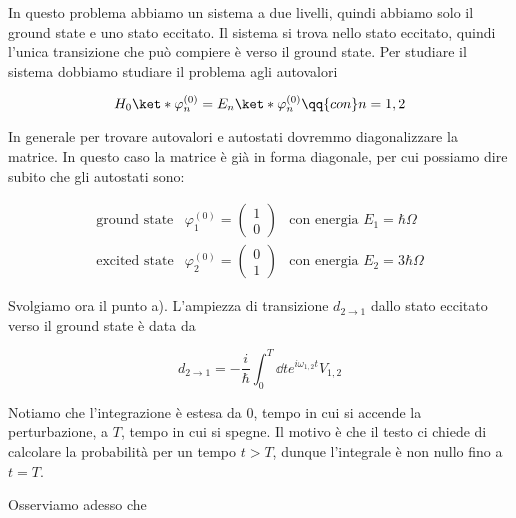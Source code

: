 \begin{soluzione}
   In questo problema abbiamo un sistema a due livelli, quindi abbiamo solo il ground state e uno stato eccitato. Il sistema si trova nello stato eccitato, quindi l'unica transizione che può compiere è verso il ground state. Per studiare il sistema dobbiamo studiare il problema agli autovalori
   
   \begin{equation*}
      H_0\ket*{\varphi_n^{(0)}}
      =E_n\ket*{\varphi_n^{(0)}}
      \qq{con}
      n=1,2
   \end{equation*}

   In generale per trovare autovalori e autostati dovremmo diagonalizzare la matrice. In questo caso la matrice è già in forma diagonale, per cui possiamo dire subito che gli autostati sono:

   \begin{eqnarray*}
      \text{ground state} & \varphi_1^{(0)}
      =
      \begin{pmatrix}
         1\\
         0
      \end{pmatrix}
      & \text{con energia } E_1=\hbar \Omega
      \\[0.1cm]
      \text{excited state} & \varphi_2^{(0)}
      =
      \begin{pmatrix}
         0\\
         1
      \end{pmatrix}
      & \text{con energia } E_2=3\hbar \Omega
   \end{eqnarray*}

   Svolgiamo ora il punto a). L'ampiezza di transizione $d_{2 \to 1}$ dallo stato eccitato verso il ground state è data da
   
   \begin{equation}
      d_{2 \to 1}
      =-\frac{i}{\hbar} \int_{0}^{T} \dd{t} e^{i\omega_{1,2} t} V_{1,2}
      \label{eq:ampiezza_di_transizione}
   \end{equation}

   Notiamo che l'integrazione è estesa da $0$, tempo in cui si accende la perturbazione, a $T$, tempo in cui si spegne. Il motivo è che il testo ci chiede di calcolare la probabilità per un tempo $t>T$, dunque l'integrale è non nullo fino a $t=T$.

   Osserviamo adesso che


\end{soluzione}
